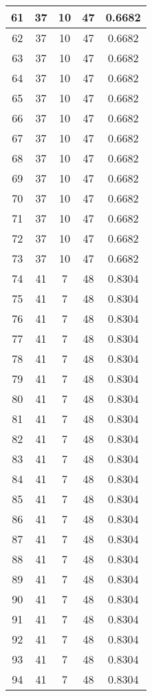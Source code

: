 \documentclass[letterpaper, 12pt]{article}
\begin{document}
\begin{longtable}{|c|c|c|c|c|}
\hline
61 & 37 & 10 & 47 & 0.6682 \\
\hline
62 & 37 & 10 & 47 & 0.6682 \\
\hline
63 & 37 & 10 & 47 & 0.6682 \\
\hline
64 & 37 & 10 & 47 & 0.6682 \\
\hline
65 & 37 & 10 & 47 & 0.6682 \\
\hline
66 & 37 & 10 & 47 & 0.6682 \\
\hline
67 & 37 & 10 & 47 & 0.6682 \\
\hline
68 & 37 & 10 & 47 & 0.6682 \\
\hline
69 & 37 & 10 & 47 & 0.6682 \\
\hline
70 & 37 & 10 & 47 & 0.6682 \\
\hline
71 & 37 & 10 & 47 & 0.6682 \\
\hline
72 & 37 & 10 & 47 & 0.6682 \\
\hline
73 & 37 & 10 & 47 & 0.6682 \\
\hline
74 & 41 & 7 & 48 & 0.8304 \\
\hline
75 & 41 & 7 & 48 & 0.8304 \\
\hline
76 & 41 & 7 & 48 & 0.8304 \\
\hline
77 & 41 & 7 & 48 & 0.8304 \\
\hline
78 & 41 & 7 & 48 & 0.8304 \\
\hline
79 & 41 & 7 & 48 & 0.8304 \\
\hline
80 & 41 & 7 & 48 & 0.8304 \\
\hline
81 & 41 & 7 & 48 & 0.8304 \\
\hline
82 & 41 & 7 & 48 & 0.8304 \\
\hline
83 & 41 & 7 & 48 & 0.8304 \\
\hline
84 & 41 & 7 & 48 & 0.8304 \\
\hline
85 & 41 & 7 & 48 & 0.8304 \\
\hline
86 & 41 & 7 & 48 & 0.8304 \\
\hline
87 & 41 & 7 & 48 & 0.8304 \\
\hline
88 & 41 & 7 & 48 & 0.8304 \\
\hline
89 & 41 & 7 & 48 & 0.8304 \\
\hline
90 & 41 & 7 & 48 & 0.8304 \\
\hline
91 & 41 & 7 & 48 & 0.8304 \\
\hline
92 & 41 & 7 & 48 & 0.8304 \\
\hline
93 & 41 & 7 & 48 & 0.8304 \\
\hline
94 & 41 & 7 & 48 & 0.8304 \\
\hline

\end{longtable}
\end{document}
